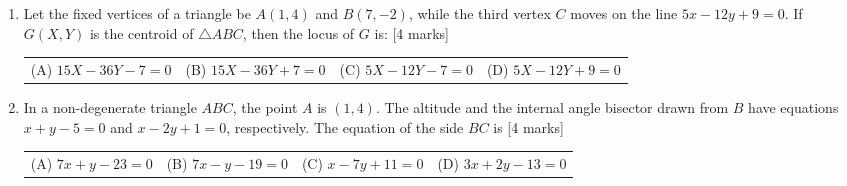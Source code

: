 \documentclass[11pt,a4paper]{article}
\begin{document}
\begin{enumerate}[resume]
\item Let the fixed vertices of a triangle be \(A(1,4)\) and \(B(7,-2)\), while the third vertex \(C\) moves on the line \(5x-12y+9=0\). If \(G(X,Y)\) is the centroid of \(\triangle ABC\), then the locus of \(G\) is: \hfill [4 marks]
{\renewcommand{\arraystretch}{1.8}
\begin{tabularx}{\linewidth}{X X X X}
(A) \quad \(15X-36Y-7=0\) & (B) \quad \(15X-36Y+7=0\) & (C) \quad \(5X-12Y-7=0\) & (D) \quad \(5X-12Y+9=0\) \\[10pt]
\end{tabularx}}
\item In a non-degenerate triangle \(ABC\), the point \(A\) is \((1,4)\). The altitude and the internal angle bisector drawn from \(B\) have equations \(x+y-5=0\) and \(x-2y+1=0\), respectively. The equation of the side \(BC\) is \hfill [4 marks]
{\renewcommand{\arraystretch}{1.8}
\begin{tabularx}{\linewidth}{X X X X}
(A) \quad \(7x+y-23=0\) & (B) \quad \(7x-y-19=0\) & (C) \quad \(x-7y+11=0\) & (D) \quad \(3x+2y-13=0\) \\[10pt]
\end{tabularx}}
\end{enumerate}
\end{document}
